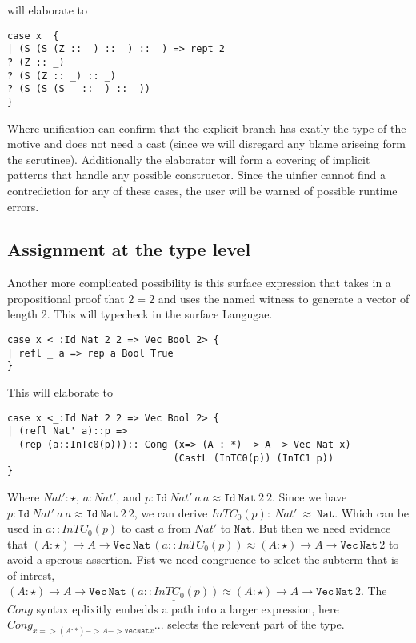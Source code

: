 will elaborate to 
\begin{lstlisting}[basicstyle={\ttfamily\small}]
case x  {
| (S (S (Z :: _) :: _) :: _) => rept 2
? (Z :: _)
? (S (Z :: _) :: _)
? (S (S (S _ :: _) :: _))
}
\end{lstlisting}

Where unification can confirm that the explicit branch has exatly the type of the motive and does not need a cast (since we will disregard any blame ariseing form the scrutinee).
Additionally the elaborator will form a covering of implicit patterns that handle any possible constructor.
Since the uinfier cannot find a contrediction for any of these cases, the user will be warned of possible runtime errors.

\subsection{Assignment at the type level}

Another more complicated possibility is this surface expression that takes in a propositional proof that $2=2$ and uses the named witness to generate a vector of length 2.
This will typecheck in the surface Langugae.

\begin{lstlisting}[basicstyle={\ttfamily\small}]
case x <_:Id Nat 2 2 => Vec Bool 2> {
| refl _ a => rep a Bool True
}
\end{lstlisting}

This will elaborate to

\begin{lstlisting}[basicstyle={\ttfamily\small}]
case x <_:Id Nat 2 2 => Vec Bool 2> {
| (refl Nat' a)::p => 
  (rep (a::InTc0(p))):: Cong (x=> (A : *) -> A -> Vec Nat x)
                             (CastL (InTC0(p)) (InTC1 p))
}
\end{lstlisting}

Where $Nat':\star$, $a:Nat'$, and $p:\mathtt{Id}\ Nat'\ a\ a\approx\mathtt{Id}\ \mathtt{Nat}\ 2\ 2$.
Since we have $p:\mathtt{Id}\ Nat'\ a\ a\approx\mathtt{Id}\ \mathtt{Nat}\ 2\ 2$, we can derive $InTC_{0}(p):\ Nat'\ \approx\ \mathtt{Nat}$.
Which can be used in $a::InTC_{0}(p)$ to cast $a$ from $Nat'$ to $\mathtt{Nat}$.
But then we need evidence that $(A:\star)\rightarrow A\rightarrow\mathtt{Vec}\,\mathtt{Nat}\,(a::InTC_{0}(p))\approx(A:\star)\rightarrow A\rightarrow\mathtt{Vec}\,\mathtt{Nat}\,2$ to avoid a sperous assertion.
Fist we need congruence to select the subterm that is of intrest, $(A:\star)\rightarrow A\rightarrow\mathtt{Vec}\,\mathtt{Nat}\,\underline{(a::InTC_{0}(p))}\approx(A:\star)\rightarrow A\rightarrow\mathtt{Vec}\,\mathtt{Nat}\,\underline{2}$.
The $Cong$ syntax eplixitly embedds a path into a larger expression, here $Cong_{x=> (A : *) -> A -> \mathtt{Vec} \mathtt{Nat} x} ...$ selects the relevent part of the type.


